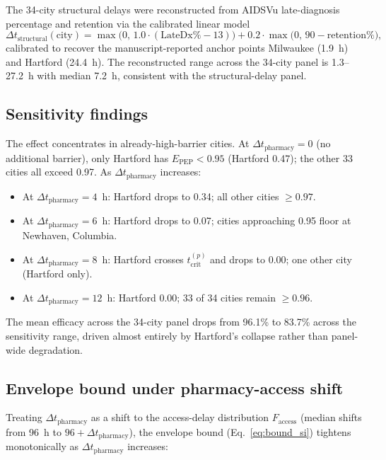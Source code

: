 \documentclass[11pt]{article}
\theoremstyle{definition}
\theoremstyle{remark}
\newcommand{\Epep}{E_{\text{PEP}}}
\newcommand{\Faccess}{F_{\text{access}}}
\newcommand{\tcrit}{t_{\text{crit}}}
\begin{document}
The 34-city structural delays were reconstructed from AIDSVu late-diagnosis percentage and retention via the calibrated linear model
\[
\Delta t_{\text{structural}}(\text{city}) = \max\!\big(0,\, 1.0 \cdot (\text{LateDx}\% - 13)\big) + 0.2 \cdot \max\!\big(0,\, 90 - \text{retention}\% \big),
\]
calibrated to recover the manuscript-reported anchor points Milwaukee (1.9~h) and Hartford (24.4~h). The reconstructed range across the 34-city panel is 1.3--27.2~h with median 7.2~h, consistent with the structural-delay panel.

\subsection{Sensitivity findings}

The effect concentrates in already-high-barrier cities. At $\Delta t_{\text{pharmacy}} = 0$ (no additional barrier), only Hartford has $\Epep < 0.95$ (Hartford 0.47); the other 33 cities all exceed 0.97. As $\Delta t_{\text{pharmacy}}$ increases:

\begin{itemize}
\item At $\Delta t_{\text{pharmacy}} = 4$~h: Hartford drops to 0.34; all other cities $\geq 0.97$.
\item At $\Delta t_{\text{pharmacy}} = 6$~h: Hartford drops to 0.07; cities approaching 0.95 floor at Newhaven, Columbia.
\item At $\Delta t_{\text{pharmacy}} = 8$~h: Hartford crosses $\tcrit^{(p)}$ and drops to 0.00; one other city (Hartford only).
\item At $\Delta t_{\text{pharmacy}} = 12$~h: Hartford 0.00; 33 of 34 cities remain $\geq 0.96$.
\end{itemize}

The mean efficacy across the 34-city panel drops from 96.1\% to 83.7\% across the sensitivity range, driven almost entirely by Hartford's collapse rather than panel-wide degradation.

\subsection{Envelope bound under pharmacy-access shift}

Treating $\Delta t_{\text{pharmacy}}$ as a shift to the access-delay distribution $\Faccess$ (median shifts from 96~h to $96 + \Delta t_{\text{pharmacy}}$), the envelope bound (Eq.~\ref{eq:bound_si}) tightens monotonically as $\Delta t_{\text{pharmacy}}$ increases:
\end{document}
